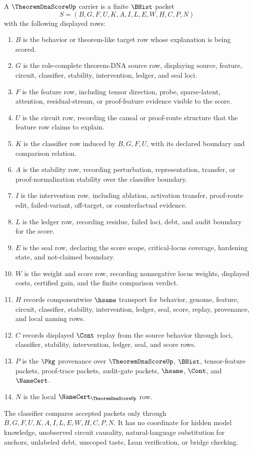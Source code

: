 \begin{definition}
\label{def:theorem-dna-score-carrier}
A $\TheoremDnaScoreUp$ carrier is a finite $\BHist$ packet
$$
S=(B,G,F,U,K,A,I,L,E,W,H,C,P,N)
$$
with the following displayed rows:
\begin{enumerate}
\item $B$ is the behavior or theorem-like target row whose explanation is being scored.
\item $G$ is the role-complete theorem-DNA source row, displaying source, feature, circuit, classifier, stability, intervention, ledger, and seal loci.
\item $F$ is the feature row, including tensor direction, probe, sparse-latent, attention, residual-stream, or proof-feature evidence visible to the score.
\item $U$ is the circuit row, recording the causal or proof-route structure that the feature row claims to explain.
\item $K$ is the classifier row induced by $B,G,F,U$, with its declared boundary and comparison relation.
\item $A$ is the stability row, recording perturbation, representation, transfer, or proof-normalization stability over the classifier boundary.
\item $I$ is the intervention row, including ablation, activation transfer, proof-route edit, failed-variant, off-target, or counterfactual evidence.
\item $L$ is the ledger row, recording residue, failed loci, debt, and audit boundary for the score.
\item $E$ is the seal row, declaring the score scope, critical-locus coverage, hardening state, and not-claimed boundary.
\item $W$ is the weight and score row, recording nonnegative locus weights, displayed costs, certified gain, and the finite comparison verdict.
\item $H$ records componentwise $\hsame$ transport for behavior, genome, feature, circuit, classifier, stability, intervention, ledger, seal, score, replay, provenance, and local naming rows.
\item $C$ records displayed $\Cont$ replay from the source behavior through loci, classifier, stability, intervention, ledger, seal, and score rows.
\item $P$ is the $\Pkg$ provenance over $\TheoremDnaScoreUp$, $\BHist$, tensor-feature packets, proof-trace packets, audit-gate packets, $\hsame$, $\Cont$, and $\NameCert$.
\item $N$ is the local $\NameCert_{\TheoremDnaScoreUp}$ row.
\end{enumerate}
The classifier compares accepted packets only through $B,G,F,U,K,A,I,L,E,W,H,C,P,N$. It has no coordinate for hidden model knowledge, unobserved circuit causality, natural-language substitution for anchors, unlabeled debt, unscoped taste, Lean verification, or bridge checking.
\end{definition}

